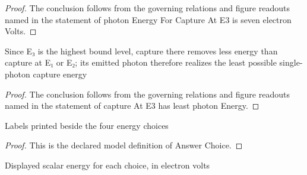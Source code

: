 \begin{proof}
  The conclusion follows from the governing relations and figure readouts named in the statement of photon Energy For Capture At E3 is seven electron Volts.
\end{proof}
\begin{lemma}
  \label{lem:physics:phyx-mini-0585:phyxminiproblems-problemphyxmini0585-captureate3-has-least-photonenergy}
  Since E₃ is the highest bound level, capture there removes less energy than capture at E₁ or E₂; its emitted photon therefore realizes the least possible single-photon capture energy
\end{lemma}
\begin{proof}
  The conclusion follows from the governing relations and figure readouts named in the statement of capture At E3 has least photon Energy.
\end{proof}
\begin{definition}
  \label{def:physics:phyx-mini-0585:phyxminiproblems-problemphyxmini0585-answerchoice}
  Labels printed beside the four energy choices
\end{definition}
\begin{proof}
  This is the declared model definition of Answer Choice.
\end{proof}
\begin{definition}
  \label{def:physics:phyx-mini-0585:phyxminiproblems-problemphyxmini0585-answerchoice-energyinelectronvolts}
  Displayed scalar energy for each choice, in electron volts
\end{definition}
